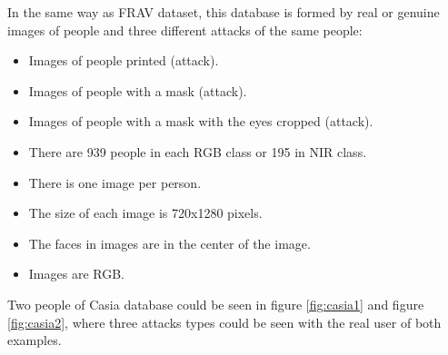 In the same way as FRAV dataset, this database is formed by real or genuine images of people and three different attacks of the same people:

\begin{itemize}
 \item Images of people printed (attack).
 \item Images of people with a mask (attack).
 \item Images of people with a mask with the eyes cropped (attack).
 \end{itemize}


\begin{itemize}
\item There are 939 people in each RGB class or 195 in NIR class.
\item There is one image per person.
\item The size of each image is 720x1280 pixels.
\item The faces in images are in the center of the image.\\
\item Images are RGB.
\end{itemize}
 
 
Two people of Casia database could be seen in figure \ref{fig:casia1} and figure \ref{fig:casia2}, where three attacks types could be seen with the real user of both examples.

